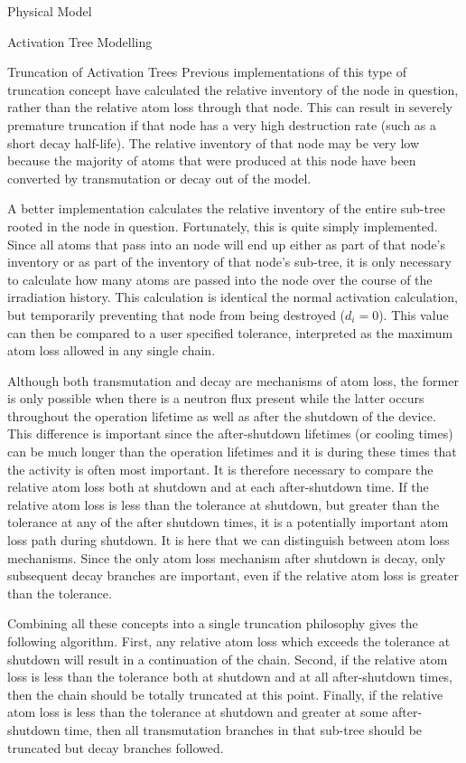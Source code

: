 \begin{chapter}{Physical Model\label{chap:physical}}
\begin{section}{Activation Tree Modelling\label{sec:physical.chains}}
\begin{subsection}{Truncation of Activation Trees}
    Previous implementations of this type of truncation concept have
    calculated the relative inventory of the node in question, rather
    than the relative atom loss through that node.  This can result in
    severely premature truncation if that node has a very high
    destruction rate (such as a short decay half-life).  The relative
    inventory of that node may be very low because the majority of
    atoms that were produced at this node have been converted by
    transmutation or decay out of the model.  
    
    A better implementation calculates the relative inventory of the
    entire sub-tree rooted in the node in question.  Fortunately, this
    is quite simply implemented.  Since all atoms that pass into an
    node will end up either as part of that node's inventory or as
    part of the inventory of that node's sub-tree, it is only
    necessary to calculate how many atoms are passed into the node
    over the course of the irradiation history.  This calculation is
    identical the normal activation calculation, but temporarily
    preventing that node from being destroyed ($d_i = 0$).  This value
    can then be compared to a user specified tolerance, interpreted as
    the maximum atom loss allowed in any single chain.
    
    Although both transmutation and decay are mechanisms of atom loss,
    the former is only possible when there is a neutron flux present
    while the latter occurs throughout the operation lifetime as well
    as after the shutdown of the device.  This difference is important
    since the after-shutdown lifetimes (or cooling times) can be much
    longer than the operation lifetimes and it is during these times
    that the activity is often most important.  It is therefore
    necessary to compare the relative atom loss both at shutdown and
    at each after-shutdown time.  If the relative atom loss is less
    than the tolerance at shutdown, but greater than the tolerance at
    any of the after shutdown times, it is a potentially important
    atom loss path during shutdown.  It is here that we can
    distinguish between atom loss mechanisms.  Since the only atom
    loss mechanism after shutdown is decay, only subsequent decay
    branches are important, even if the relative atom loss is greater
    than the tolerance.

    Combining all these concepts into a single truncation philosophy
    gives the following algorithm.  First, any relative atom loss
    which exceeds the tolerance at shutdown will result in a
    continuation of the chain.  Second, if the relative atom loss is
    less than the tolerance both at shutdown and at all after-shutdown
    times, then the chain should be totally truncated at this point.
    Finally, if the relative atom loss is less than the tolerance at
    shutdown and greater at some after-shutdown time, then all
    transmutation branches in that sub-tree should be truncated but
    decay branches followed.
    

\end{subsection}
\end{section}
\end{chapter}
